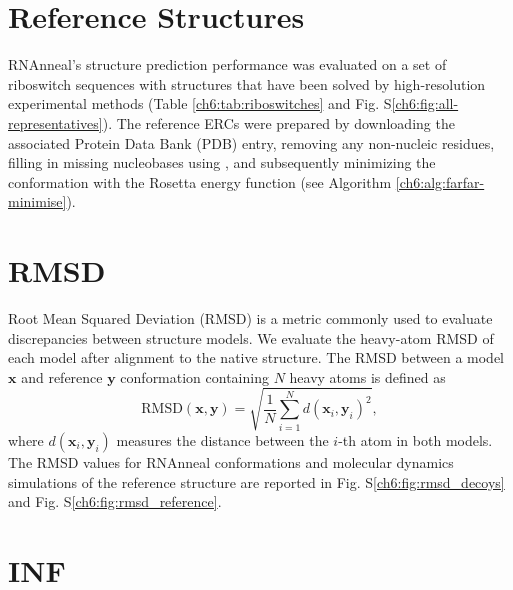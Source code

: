 \section{Reference Structures}
{}
\label{ch6:methods:preparation}

RNAnneal's structure prediction performance was evaluated on a set of riboswitch sequences with structures that have been solved by high-resolution experimental methods (Table \ref{ch6:tab:riboswitches} and Fig. S\ref{ch6:fig:all-representatives}). The reference ERCs were prepared by downloading the associated Protein Data Bank (PDB) entry, removing any non-nucleic residues, filling in missing nucleobases using , and subsequently minimizing the conformation with the Rosetta energy function (see Algorithm \ref{ch6:alg:farfar-minimise}).

\section{RMSD}
{}
\label{ch6:methods:rmsd}

Root Mean Squared Deviation (RMSD) is a metric commonly used to evaluate discrepancies between structure models. We evaluate the heavy-atom RMSD of each model after alignment to the native structure. The RMSD between a model $\mathbf{x}$ and reference $\mathbf{y}$ conformation containing $N$ heavy atoms is defined as
\begin{equation}
    \mathrm{RMSD}(\mathbf{x}, \mathbf{y}) = \sqrt{\frac{1}{N}\sum_{i=1}^N d(\mathbf{x}_i, \mathbf{y}_i)^2},
\end{equation}
where $d(\mathbf{x}_i, \mathbf{y}_i)$ measures the distance between the $i$-th atom in both models. The RMSD values for RNAnneal conformations and molecular dynamics simulations of the reference structure are reported in Fig. S\ref{ch6:fig:rmsd_decoys} and Fig. S\ref{ch6:fig:rmsd_reference}.

\section{INF}
       {}
\label{ch6:methods:inf}

